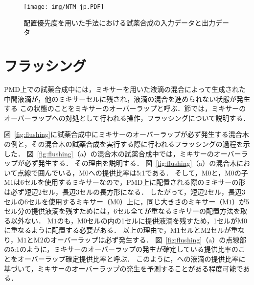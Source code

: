 \begin{figure}[tbp]
    \centering\texttt{[image: img/NTM\_jp.PDF]}
    \caption{配置優先度を用いた手法における試薬合成の入力データと出力データ}\label{fig:NTM}
\end{figure}


\section{フラッシング}
\label{sec:flushing}
    PMD上での試薬合成中には，ミキサーを用いた液滴の混合によって生成された中間液滴が，他のミキサーセルに残され，液滴の混合を進められない状態が発生する
    この状態のことをミキサーのオーバーラップと呼ぶ．節では，ミキサーのオーバーラップへの対処として行われる操作，フラッシングについて説明する．
    
    図~\ref{fig:flushing}に試薬合成中にミキサーのオーバーラップが必ず発生する混合木の例と，その混合木の試薬合成を実行する際に行われるフラッシングの過程を示した．
    図~\ref{fig:flushing}（a）の混合木の試薬合成中では，ミキサーのオーバーラップが必ず発生する．
    その理由を説明する．
    図~\ref{fig:flushing}（a）の混合木において点線で囲んでいる，M$0$への提供比率は5:1である．
    そして，M$0$と，M$0$の子M$1$は6セルを使用するミキサーなので，PMD上に配置される際のミキサーの形は必ず短辺2セル，長辺3セルの長方形になる．
    したがって，短辺2セル，長辺3セルの6セルを使用するミキサー（M$0$）上に，同じ大きさのミキサー（M$1$）が5セル分の提供液滴を残すためには，6セル全てが重なるミキサーの配置方法を取る以外ない．
    M$1$のも，M$0$セルの内の1セルに提供液滴を残すため，1セルがM$0$に重なるように配置する必要がある．
    以上の理由で，M$1$セルとM$2$セルが重なり，M$1$とM$2$のオーバーラップは必ず発生する．
    図~\ref{fig:flushing}（a）の点線部の5:1のように，ミキサーのオーバーラップの発生が確定している提供比率のことをオーバーラップ確定提供比率と呼ぶ．
    このように，への液滴の提供比率に基づいて，ミキサーのオーバーラップの発生を予測することがある程度可能である．
    
